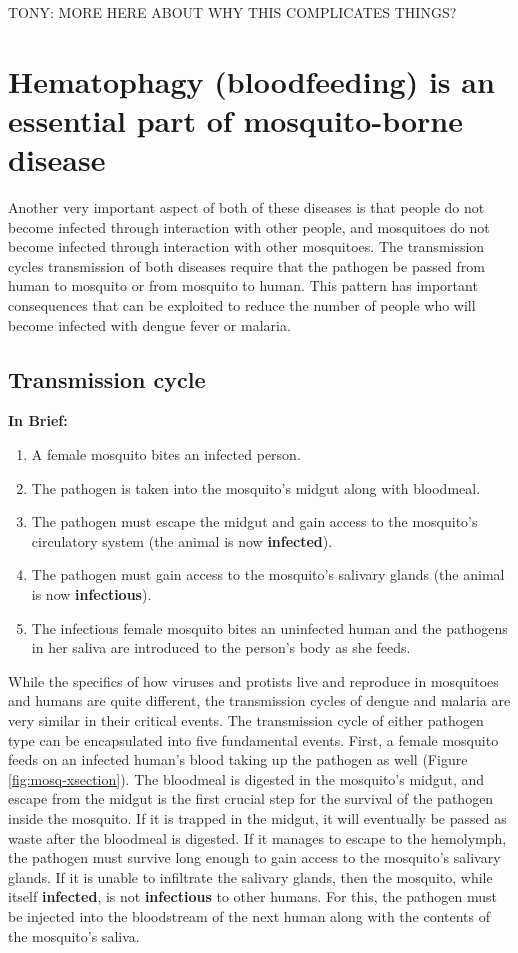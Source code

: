 \alert{TONY: MORE HERE ABOUT WHY THIS COMPLICATES THINGS?}

\section{Hematophagy (bloodfeeding) is an essential part of mosquito-borne disease}

Another very important aspect of both of these diseases is that people do not become infected through interaction with other people, and mosquitoes do not become infected through interaction with other mosquitoes.
The transmission cycles transmission of both diseases require that the pathogen be passed from human to mosquito or from mosquito to human.
This pattern has important consequences that can be exploited to reduce the number of people who will become infected with dengue fever or malaria.

\subsection{Transmission cycle}

\textbf{In Brief:}
\begin{enumerate}
\item A female mosquito bites an infected person.
\item The pathogen is taken into the mosquito's midgut along with bloodmeal.
\item The pathogen must escape the midgut and gain access to the mosquito's circulatory system (the animal is now \textbf{infected}).
\item The pathogen must gain access to the mosquito's salivary glands (the animal is now \textbf{infectious}).
\item The infectious female mosquito bites an uninfected human and the pathogens in her saliva are introduced to the person's body as she feeds.
\end{enumerate}



While the specifics of how viruses and protists live and reproduce in mosquitoes and humans are quite different, the transmission cycles of dengue and malaria are very similar in their critical events.
The transmission cycle of either pathogen type can be encapsulated into five fundamental events.
First, a female mosquito feeds on an infected human's blood taking up the pathogen as well (Figure \ref{fig:mosq-xsection}).
The bloodmeal is digested in the mosquito's midgut, and escape from the midgut is the first crucial step for the survival of the pathogen inside the mosquito.
If it is trapped in the midgut, it will eventually be passed as waste after the bloodmeal is digested.
If it manages to escape to the \gls{hemolymph}, the pathogen must survive long enough to gain access to the mosquito's salivary glands.
If it is unable to infiltrate the salivary glands, then the mosquito, while itself \textbf{infected}, is not \textbf{infectious} to other humans.
For this, the pathogen must be injected into the bloodstream of the next human along with the contents of the mosquito's saliva.


